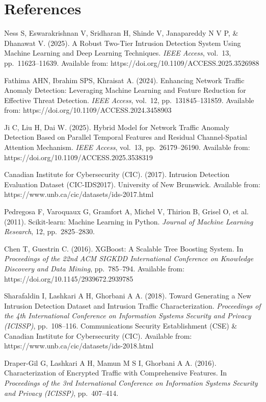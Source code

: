 \documentclass[12pt,a4paper]{report}
\begin{document}
\newpage


\newpage
\chapter{References}

\begin{enumerate}[label={[\arabic*]}, leftmargin=2.2em, itemsep=0.8em]
    \item Ness S, Eswarakrishnan V, Sridharan H, Shinde V, Janapareddy N V P, \& Dhanawat V. (2025). A Robust Two-Tier Intrusion Detection System Using Machine Learning and Deep Learning Techniques. \textit{IEEE Access}, vol.~13, pp.~11623--11639. Available from: https://doi.org/10.1109/ACCESS.2025.3526988
    \item Fathima AHN, Ibrahim SPS, Khraisat A. (2024). Enhancing Network Traffic Anomaly Detection: Leveraging Machine Learning and Feature Reduction for Effective Threat Detection. \textit{IEEE Access}, vol.~12, pp.~131845--131859. Available from: https://doi.org/10.1109/ACCESS.2024.3458903
    \item Ji C, Liu H, Dai W. (2025). Hybrid Model for Network Traffic Anomaly Detection Based on Parallel Temporal Features and Residual Channel-Spatial Attention Mechanism. \textit{IEEE Access}, vol.~13, pp.~26179--26190. Available from: https://doi.org/10.1109/ACCESS.2025.3538319
    \item Canadian Institute for Cybersecurity (CIC). (2017). Intrusion Detection Evaluation Dataset (CIC-IDS2017). University of New Brunswick. Available from: https://www.unb.ca/cic/datasets/ids-2017.html
    \item Pedregosa F, Varoquaux G, Gramfort A, Michel V, Thirion B, Grisel O, et al. (2011). Scikit-learn: Machine Learning in Python. \textit{Journal of Machine Learning Research}, 12, pp.~2825--2830.
    \item Chen T, Guestrin C. (2016). XGBoost: A Scalable Tree Boosting System. In \textit{Proceedings of the 22nd ACM SIGKDD International Conference on Knowledge Discovery and Data Mining}, pp.~785--794. Available from: https://doi.org/10.1145/2939672.2939785
    \item Sharafaldin I, Lashkari A H, Ghorbani A A. (2018). Toward Generating a New Intrusion Detection Dataset and Intrusion Traffic Characterization. \textit{Proceedings of the 4th International Conference on Information Systems Security and Privacy (ICISSP)}, pp.~108--116. Communications Security Establishment (CSE) \& Canadian Institute for Cybersecurity (CIC). Available from: https://www.unb.ca/cic/datasets/ids-2018.html
    \item Draper-Gil G, Lashkari A H, Mamun M S I, Ghorbani A A. (2016). Characterization of Encrypted Traffic with Comprehensive Features. In \textit{Proceedings of the 3rd International Conference on Information Systems Security and Privacy (ICISSP)}, pp.~407--414.
\end{enumerate}
\end{document}
